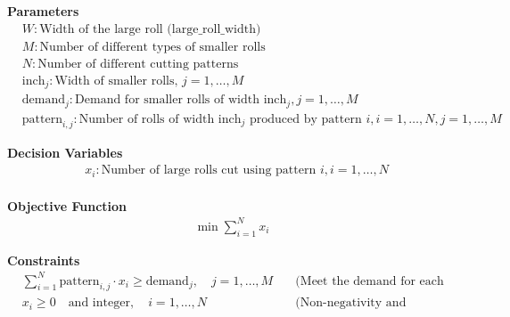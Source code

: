 \documentclass{article}
\begin{document}
\textbf{Parameters}
\begin{align*}
    & W: \text{Width of the large roll (large\_roll\_width)} \\
    & M: \text{Number of different types of smaller rolls} \\
    & N: \text{Number of different cutting patterns} \\
    & \text{inch}_j: \text{Width of smaller rolls, } j = 1, \ldots, M \\
    & \text{demand}_j: \text{Demand for smaller rolls of width } \text{inch}_j, j = 1, \ldots, M \\
    & \text{pattern}_{i,j}: \text{Number of rolls of width } \text{inch}_j \text{ produced by pattern } i, i = 1, \ldots, N, j = 1, \ldots, M
\end{align*}

\textbf{Decision Variables}
\begin{align*}
    & x_i: \text{Number of large rolls cut using pattern } i, i = 1, \ldots, N \\
\end{align*}

\textbf{Objective Function}
\begin{align*}
    \min \sum_{i=1}^{N} x_i
\end{align*}

\textbf{Constraints}
\begin{align*}
    & \sum_{i=1}^{N} \text{pattern}_{i,j} \cdot x_i \geq \text{demand}_j, \quad j = 1, \ldots, M \quad & \text{(Meet the demand for each roll type)} \\
    & x_i \geq 0 \quad \text{and integer}, \quad i = 1, \ldots, N \quad & \text{(Non-negativity and integrality)}
\end{align*}
\end{document}
